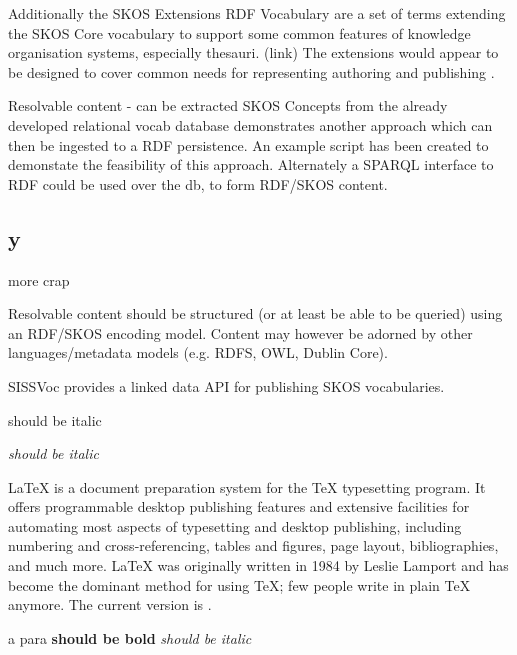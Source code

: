 \documentclass[10pt,a4paper]{article}
\begin{document}
\begin{flushleft}
  Additionally the SKOS Extensions RDF Vocabulary are a set of terms extending 
  the SKOS Core vocabulary to support some common features of knowledge 
  organisation systems, especially thesauri. (link) The extensions would appear 
  to be designed to cover common needs for representing authoring and publishing .

  Resolvable content - can be extracted SKOS Concepts from the already developed 
  relational vocab database demonstrates another approach which can then be 
  ingested to a RDF persistence. An example script has been created to demonstate 
  the feasibility of this approach. Alternately a SPARQL interface to RDF could 
  be used over the db, to form RDF/SKOS content.




\subsection{y}
  more crap


\begin{subsection}{Resolvable content should be structured (or at least be able to be queried)
  using an RDF/SKOS encoding model. Content may however be adorned by other
  languages/metadata models (e.g. RDFS, OWL, Dublin Core).  }

	SISSVoc provides a linked data API for publishing SKOS vocabularies.


  \begin{textit}{
    should be italic
  }
  \end{textit}


\end{subsection}





  \end{flushleft}


  \textit{should be italic}


\LaTeX{} is a document preparation system for the \TeX{}
  typesetting program. It offers programmable desktop
  publishing features and extensive facilities for
  automating most aspects of typesetting and desktop
  publishing, including numbering and cross-referencing,
  tables and figures, page layout, bibliographies, and
  much more. \LaTeX{} was originally written in 1984 by
  Leslie Lamport and has become the dominant method for
  using \TeX; few people write in plain \TeX{} anymore.
  The current version is \LaTeXe.

  \begin{flushright}
  a para
  \textbf{should be bold}
  \textit{should be italic}

  \end{flushright}
\end{document}
